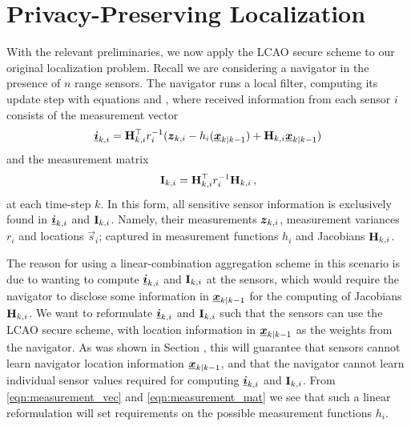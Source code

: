 \documentclass[10pt,letterpaper,oneside,twocolumn,journal]{IEEEtran}
\theoremstyle{definition}
\theoremstyle{definition}
\theoremstyle{remark}
\begin{document}
\section{Privacy-Preserving Localization} \label{sec:priv_localization}
With the relevant preliminaries, we now apply the LCAO secure scheme to our original localization problem. Recall we are considering a navigator in the presence of $n$ range sensors. The navigator runs a local filter, computing its update step with equations  and , where received information from each sensor $i$ consists of the measurement vector
\begin{equation}
    \rvec{i}_{k,i} = \mat{H}^\top_{k,i} r^{-1}_i (\rv{z}_{k,i} - h_i(\rvec{x}_{k|k-1}) + \mat{H}_{k,i}\rvec{x}_{k|k-1}) \label{eqn:measurement_vec}
\end{equation}
and the measurement matrix
\begin{equation}
    \mat{I}_{k,i} = \mat{H}^\top_{k,i} r^{-1}_i \mat{H}_{k,i}\,, \label{eqn:measurement_mat}
\end{equation}
at each time-step $k$. In this form, all sensitive sensor information is exclusively found in ${\boldsymbol{\underline{i}}}_{k,i}$ and ${{\mathbf{I}}}_{k,i}$. Namely, their measurements ${\boldsymbol{z}}_{k,i}$, measurement variances $r_i$ and locations $\vec{s}_i$; captured in measurement functions $h_i$ and Jacobians ${{\mathbf{H}}}_{k,i}$. 

The reason for using a linear-combination aggregation scheme in this scenario is due to wanting to compute ${\boldsymbol{\underline{i}}}_{k,i}$ and ${{\mathbf{I}}}_{k,i}$ at the sensors, which would require the navigator to disclose some information in ${\boldsymbol{\underline{x}}}_{k|k-1}$ for the computing of Jacobians ${{\mathbf{H}}}_{k,i}$. We want to reformulate ${\boldsymbol{\underline{i}}}_{k,i}$ and ${{\mathbf{I}}}_{k,i}$ such that the sensors can use the LCAO secure scheme, with location information in ${\boldsymbol{\underline{x}}}_{k|k-1}$ as the weights from the navigator. As was shown in Section , this will guarantee that sensors cannot learn navigator location information ${\boldsymbol{\underline{x}}}_{k|k-1}$, and that the navigator cannot learn individual sensor values required for computing ${\boldsymbol{\underline{i}}}_{k,i}$ and ${{\mathbf{I}}}_{k,i}$. From \eqref{eqn:measurement_vec} and \eqref{eqn:measurement_mat} we see that such a linear reformulation will set requirements on the possible measurement functions $h_i$. 

% 
% 
\end{document}
